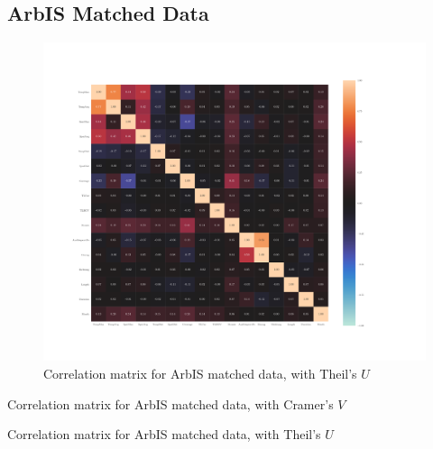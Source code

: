 \documentclass[a4paper,headsepline,footsepline,fontsize=11pt,BCOR=12mm,DIV=12]{report}
\newcommand{\nocontentsline}[3]{}
\newcommand{\tocless}[2]{\bgroup\let\addcontentsline=\nocontentsline#1{#2}\egroup}
\begin{document}
\begin{appendices}
\tocless\section{ArbIS Matched Data}
\label{appendix_ArbIS_matched}

\label{appendix_baysis_dataset_corr_theils}
\begin{figure}[h]
	\centering
	\includegraphics[scale=0.4]{../CorrAnalysis/data/ArbIS/02_matched/plots/arbis_matched_corr_theils}
	\caption{Correlation matrix for ArbIS matched data, with Theil's $U$}
	\label{img:appendix_correlation_matrix_matched_theils}
\end{figure}
\restoregeometry

\begin{table}
\tiny
\setlength{\tabcolsep}{4pt}
\centering

\caption{Correlation matrix for ArbIS matched data, with Cramer's $V$}
\end{table}

\begin{table}
\tiny
\setlength{\tabcolsep}{4pt}
\centering

\caption{Correlation matrix for ArbIS matched data, with Theil's $U$}
\end{table}


\end{appendices}
\end{document}
